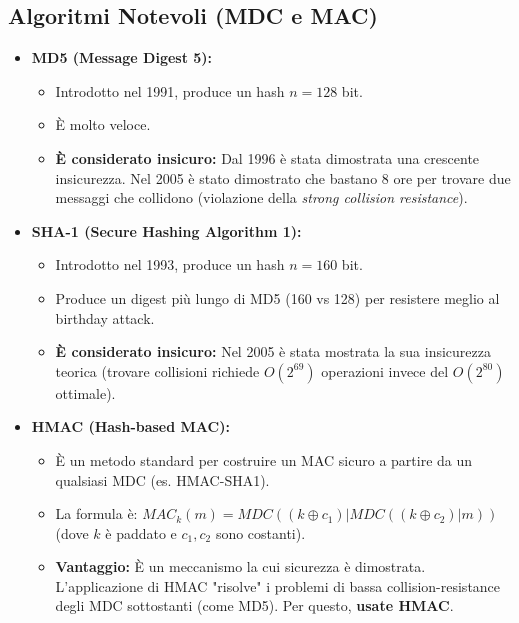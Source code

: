 \documentclass[../main.tex]{subfiles}
\begin{document}
\subsection{Algoritmi Notevoli (MDC e MAC)}
\begin{itemize}
    \item \textbf{MD5 (Message Digest 5):}
          \begin{itemize}
              \item Introdotto nel 1991, produce un hash $n=128$ bit.
              \item È molto veloce.
              \item \textbf{È considerato insicuro:} Dal 1996 è stata dimostrata una crescente insicurezza. Nel 2005 è stato dimostrato che bastano 8 ore per trovare due messaggi che collidono (violazione della \emph{strong collision resistance}).
          \end{itemize}
    \item \textbf{SHA-1 (Secure Hashing Algorithm 1):}
          \begin{itemize}
              \item Introdotto nel 1993, produce un hash $n=160$ bit.
              \item Produce un digest più lungo di MD5 (160 vs 128) per resistere meglio al birthday attack.
              \item \textbf{È considerato insicuro:} Nel 2005 è stata mostrata la sua insicurezza teorica (trovare collisioni richiede $O(2^{69})$ operazioni invece del $O(2^{80})$ ottimale).
          \end{itemize}
    \item \textbf{HMAC (Hash-based MAC):}
          \begin{itemize}
              \item È un metodo standard per costruire un MAC sicuro a partire da un qualsiasi MDC (es. HMAC-SHA1).
              \item La formula è: $MAC_k(m) = MDC((k \oplus c_1) | MDC((k \oplus c_2) | m))$ (dove $k$ è paddato e $c_1, c_2$ sono costanti).
              \item \textbf{Vantaggio:} È un meccanismo la cui sicurezza è dimostrata. L'applicazione di HMAC "risolve" i problemi di bassa collision-resistance degli MDC sottostanti (come MD5). Per questo, \textbf{usate HMAC}.
          \end{itemize}
\end{itemize}
\end{document}
